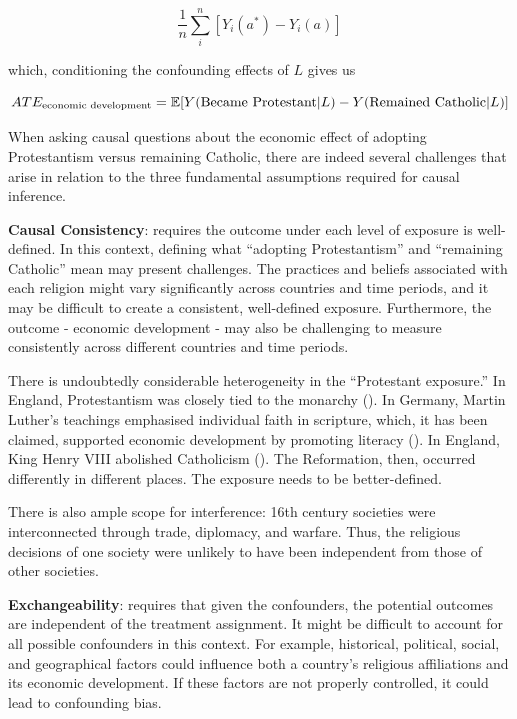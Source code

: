 \documentclass[
  singlecolumn,
  9pt]{article}
\begin{document}
\[
\frac{1}{n} \sum_i^{n} \left[ Y_i(a^*) - Y_i(a) \right]
\]

which, conditioning the confounding effects of \(L\) gives us

\[ATE_{\textnormal{economic~development}} = \mathbb{E}[Y(\textnormal{Became~Protestant}|L) - Y(\textnormal{Remained~Catholic}|L)]\]

When asking causal questions about the economic effect of adopting
Protestantism versus remaining Catholic, there are indeed several
challenges that arise in relation to the three fundamental assumptions
required for causal inference.

\textbf{Causal Consistency}: requires the outcome under each level of
exposure is well-defined. In this context, defining what ``adopting
Protestantism'' and ``remaining Catholic'' mean may present challenges.
The practices and beliefs associated with each religion might vary
significantly across countries and time periods, and it may be difficult
to create a consistent, well-defined exposure. Furthermore, the outcome
- economic development - may also be challenging to measure consistently
across different countries and time periods.

There is undoubtedly considerable heterogeneity in the ``Protestant
exposure.'' In England, Protestantism was closely tied to the monarchy
(). In Germany, Martin
Luther's teachings emphasised individual faith in scripture, which, it
has been claimed, supported economic development by promoting literacy
(). In England,
King Henry VIII abolished Catholicism
(). The Reformation, then,
occurred differently in different places. The exposure needs to be
better-defined.

There is also ample scope for interference: 16th century societies were
interconnected through trade, diplomacy, and warfare. Thus, the
religious decisions of one society were unlikely to have been
independent from those of other societies.

\textbf{Exchangeability}: requires that given the confounders, the
potential outcomes are independent of the treatment assignment. It might
be difficult to account for all possible confounders in this context.
For example, historical, political, social, and geographical factors
could influence both a country's religious affiliations and its economic
development. If these factors are not properly controlled, it could lead
to confounding bias.
\end{document}
